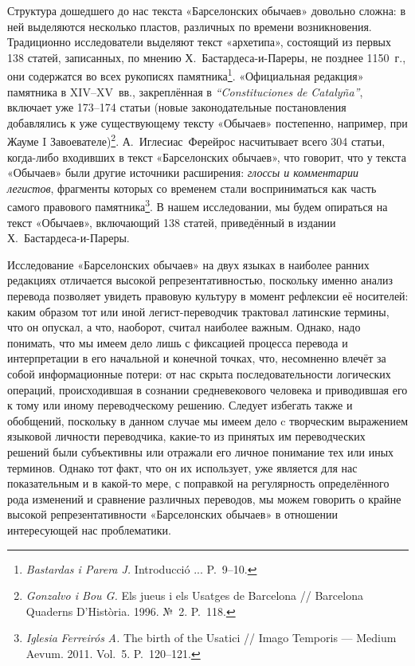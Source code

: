 Структура дошедшего до нас текста «Барселонских обычаев» довольно сложна: в ней выделяются несколько пластов, различных по времени возникновения. Традиционно исследователи выделяют текст «архетипа», состоящий из первых 138 статей, записанных, по мнению Х.~Бастардеса-и-Пареры, не позднее 1150~г., они содержатся во всех рукописях памятника\footnote{\emph{Bastardas i Parera J.} Introducció ... P.~9--10.}. «Официальная редакция» памятника в XIV--XV~вв., закреплённая в \emph{“}\emph{Constituciones}\emph{ }\emph{de}\emph{ }\emph{Cataly}\emph{ñ}\emph{a}\emph{”}, включает уже 173--174 статьи (новые законодательные постановления добавлялись к уже существующему тексту «Обычаев» постепенно, например, при Жауме I Завоевателе)\footnote{\emph{Gonzalvo i Bou G.} Els jueus i els Usatges de Barcelona // Barcelona Quaderns D'Història. 1996. №~2. P.~118.}. А.~Иглесиас~Ферейрос насчитывает всего 304 статьи, когда-либо входивших в текст «Барселонских обычаев», что говорит, что у текста «Обычаев» были другие источники расширения: \emph{глоссы и комментарии легистов}, фрагменты которых со временем стали восприниматься как часть самого правового памятника\footnote{\emph{Iglesia }\emph{Ferreirós}\emph{ A. }The birth of the Usatici // Imago Temporis --- Medium Aevum. 2011. Vol.~5. P.~120--121.}. В нашем исследовании, мы будем опираться на текст «Обычаев», включающий 138 статей, приведённый в издании Х.~Бастардеса-и-Пареры.

Исследование «Барселонских обычаев» на двух языках в наиболее ранних редакциях отличается высокой репрезентативностью, поскольку именно анализ перевода позволяет увидеть правовую культуру в момент рефлексии её носителей: каким образом тот или иной легист-переводчик трактовал латинские термины, что он опускал, а что, наоборот, считал наиболее важным. Однако, надо понимать, что мы имеем дело лишь с фиксацией процесса перевода и интерпретации в его начальной и конечной точках, что, несомненно влечёт за собой информационные потери: от нас скрыта последовательности логических операций, происходившая в сознании средневекового человека и приводившая его к тому или иному переводческому решению. Следует избегать также и обобщений, поскольку в данном случае мы имеем дело c творческим выражением языковой личности переводчика, какие-то из принятых им переводческих решений были субъективны или отражали его личное понимание тех или иных терминов. Однако тот факт, что он их использует, уже является для нас показательным и в какой-то мере, с поправкой на регулярность определённого рода изменений и сравнение различных переводов, мы можем говорить о крайне высокой репрезентативности «Барселонских обычаев» в отношении интересующей нас проблематики.

